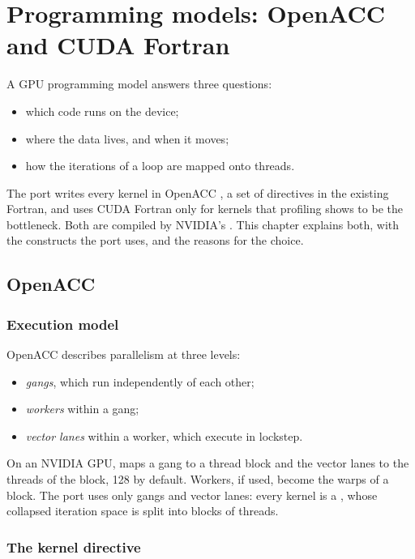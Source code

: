 \chapter{Programming models: OpenACC and CUDA Fortran}\label{ch:gpu}

A GPU programming model answers three questions:
\begin{itemize}
  \item which code runs on the device;
  \item where the data lives, and when it moves;
  \item how the iterations of a loop are mapped onto threads.
\end{itemize}
The port writes every kernel in OpenACC \citep{openacc33}, a set of directives in the existing Fortran, and uses
CUDA Fortran \citep{cudafortran} only for kernels that profiling shows to be the bottleneck. Both are compiled by
NVIDIA's . This chapter explains both, with the constructs the port uses, and the reasons for the
choice.

\section{OpenACC}

\subsection{Execution model}

OpenACC describes parallelism at three levels:
\begin{itemize}
  \item \emph{gangs}, which run independently of each other;
  \item \emph{workers} within a gang;
  \item \emph{vector lanes} within a worker, which execute in lockstep.
\end{itemize}
On an NVIDIA GPU,  maps a gang to a thread block and the vector lanes to the threads of the block,
128 by default. Workers, if used, become the warps of a block. The port uses only gangs and vector lanes: every
kernel is a , whose collapsed iteration space is split into blocks of
 threads.

\subsection{The kernel directive}

